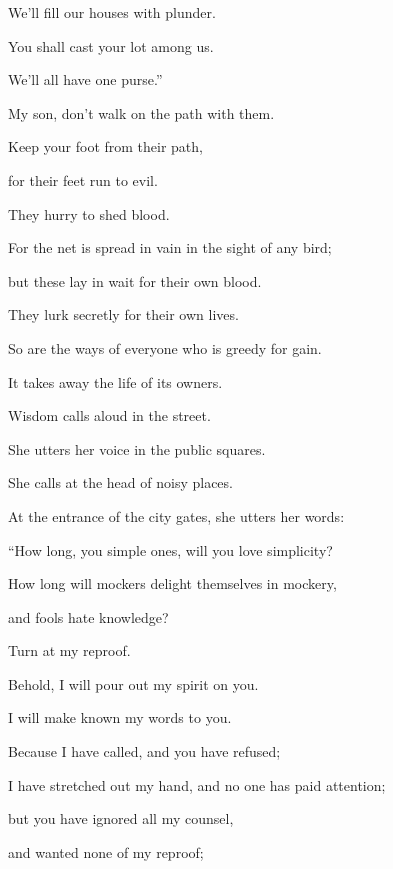 {\par }{\QB We’ll fill our houses with plunder.
\par }{\Q {}You shall cast your lot among us.
\par }{\QB We’ll all have one purse.”
\par }{\Q {}My son, don’t walk on the path with them.
\par }{\QB Keep your foot from their path,
\par }{\Q {}for their feet run to evil.
\par }{\QB They hurry to shed blood.
\par }{\Q {}For the net is spread in vain in the sight of any bird;
\par }{\Q {}but these lay in wait for their own blood.
\par }{\QB They lurk secretly for their own lives.
\par }{\Q {}So are the ways of everyone who is greedy for gain.
\par }{\QB It takes away the life of its owners.
\par }{\BB \par }{\Q {}Wisdom calls aloud in the street.
\par }{\QB She utters her voice in the public squares.
\par }{\Q {}She calls at the head of noisy places.
\par }{\QB At the entrance of the city gates, she utters her words:
\par }{\Q {}“How long, you simple ones, will you love simplicity?
\par }{\QB How long will mockers delight themselves in mockery,
\par }{\QB and fools hate knowledge?
\par }{\Q {}Turn at my reproof.
\par }{\QB Behold, I will pour out my spirit on you.
\par }{\QB I will make known my words to you.
\par }{\Q {}Because I have called, and you have refused;
\par }{\QB I have stretched out my hand, and no one has paid attention;
\par }{\Q {}but you have ignored all my counsel,
\par }{\QB and wanted none of my reproof;
}
